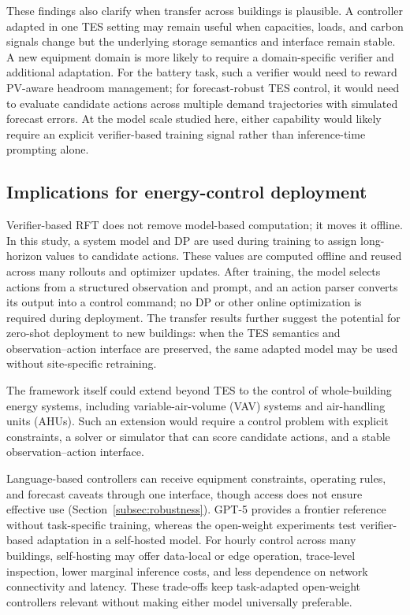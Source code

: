 \documentclass[11pt]{article}
\begin{document}
These findings also clarify when transfer across buildings is plausible. A controller adapted in one TES setting may remain useful when capacities, loads, and carbon signals change but the underlying storage semantics and interface remain stable. A new equipment domain is more likely to require a domain-specific verifier and additional adaptation. For the battery task, such a verifier would need to reward PV-aware headroom management; for forecast-robust TES control, it would need to evaluate candidate actions across multiple demand trajectories with simulated forecast errors. At the model scale studied here, either capability would likely require an explicit verifier-based training signal rather than inference-time prompting alone.

\subsection{Implications for energy-control deployment}\label{subsec:framework-outlook}
Verifier-based RFT does not remove model-based computation; it moves it offline. In this study, a system model and DP are used during training to assign long-horizon values to candidate actions. These values are computed offline and reused across many rollouts and optimizer updates. After training, the model selects actions from a structured observation and prompt, and an action parser converts its output into a control command; no DP or other online optimization is required during deployment. The transfer results further suggest the potential for zero-shot deployment to new buildings: when the TES semantics and observation--action interface are preserved, the same adapted model may be used without site-specific retraining.

The framework itself could extend beyond TES to the control of whole-building energy systems, including variable-air-volume (VAV) systems and air-handling units (AHUs). Such an extension would require a control problem with explicit constraints, a solver or simulator that can score candidate actions, and a stable observation--action interface.

Language-based controllers can receive equipment constraints, operating rules, and forecast caveats through one interface, though access does not ensure effective use (Section~\ref{subsec:robustness}). GPT-5 provides a frontier reference without task-specific training, whereas the open-weight experiments test verifier-based adaptation in a self-hosted model. For hourly control across many buildings, self-hosting may offer data-local or edge operation, trace-level inspection, lower marginal inference costs, and less dependence on network connectivity and latency. These trade-offs keep task-adapted open-weight controllers relevant without making either model universally preferable.
\end{document}
